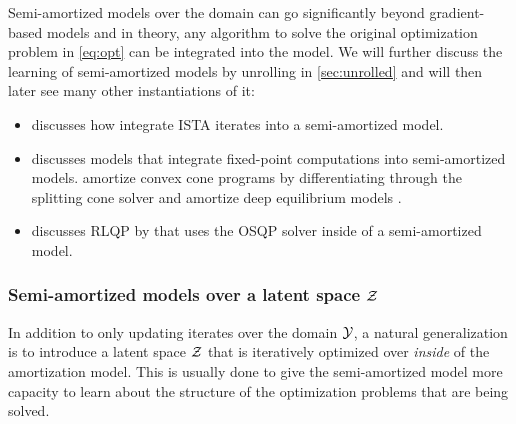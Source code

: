 \documentclass[twoside,11pt]{article}
\begin{document}
Semi-amortized models over the domain can go significantly beyond
gradient-based models and in theory, any algorithm to solve
the original optimization problem in \cref{eq:opt}
can be integrated into the model.
We will further discuss the learning of semi-amortized
models by unrolling in \cref{sec:unrolled} and will
then later see many other instantiations of it:
\begin{itemize}
\item {} discusses how
\citet{gregor2010learning} integrate ISTA iterates
\citep{daubechies2004iterative,beck2009fast}
into a semi-amortized model.
\item {} discusses models that integrate
fixed-point computations into semi-amortized models.
\citet{venkataraman2021neural} amortize convex cone programs by
differentiating through the splitting cone solver \citep{o2016conic}
and \citet{bai2022neural} amortize
deep equilibrium models \citep{bai2019deep,bai2020multiscale}.
\item {} discusses RLQP by \citet{ichnowski2021accelerating}
  that uses the OSQP solver \citep{stellato2018osqp} inside
  of a semi-amortized model.
\end{itemize}

\subsubsection{Semi-amortized models over a latent space ${\mathcal{Z}}$}
\label{sec:semi-latent}
\begin{center}
\end{center}
\vspace{-3mm}

In addition to only updating iterates over the domain ${\mathcal{Y}}$,
a natural generalization is to introduce a latent space ${\mathcal{Z}}$
that is iteratively optimized over \emph{inside} of
the amortization model.
This is usually done to give the semi-amortized model
more capacity to learn about the structure of the optimization
problems that are being solved.
\end{document}
